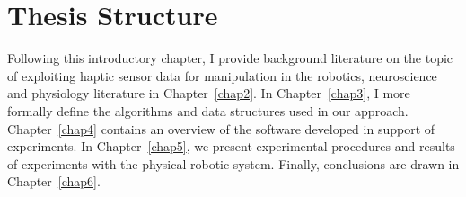 
\section{Thesis Structure}
Following this introductory chapter, I provide background literature on the topic of exploiting haptic sensor data for manipulation in the robotics, neuroscience and physiology literature in Chapter~\ref{chap2}.
In Chapter~\ref{chap3}, I more formally define the algorithms and data structures used in our approach.
Chapter~\ref{chap4} contains an overview of the software developed in support of experiments.
In Chapter~\ref{chap5}, we present experimental procedures and results of experiments with the physical robotic system.
Finally, conclusions are drawn in Chapter~\ref{chap6}.
